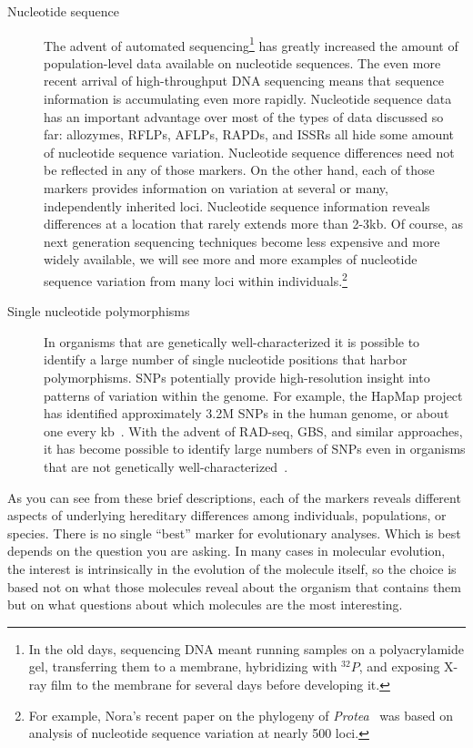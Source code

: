 \begin{description}
\item[Nucleotide sequence] The advent of automated
  sequencing\footnote{In the old days, sequencing DNA meant running
    samples on a polyacrylamide gel, transferring them to a membrane,
    hybridizing with $^{32}P$, and exposing X-ray film to the membrane
    for several days before developing it.} has greatly increased the
  amount of population-level data available on nucleotide
  sequences. The even more recent arrival of high-throughput DNA
  sequencing means that sequence information is accumulating even more
  rapidly. Nucleotide sequence data has an important advantage over
  most of the types of data discussed so far: allozymes, RFLPs, AFLPs,
  RAPDs, and ISSRs all hide some amount of nucleotide sequence
  variation. Nucleotide sequence differences need not be reflected in
  any of those markers. On the other hand, each of those markers
  provides information on variation at several or many, independently
  inherited loci. Nucleotide sequence information reveals differences
  at a location that rarely extends more than 2-3kb. Of course, as
  next generation sequencing techniques become less expensive and more
  widely available, we will see more and more examples of nucleotide
  sequence variation from many loci within individuals.\footnote{For
    example, Nora's recent paper on the phylogeny of {\it
      Protea\/}~\cite{Mitchell-etal-2017} was based on analysis of
    nucleotide sequence variation at nearly 500 loci.}

\item[Single nucleotide polymorphisms] In organisms that are
  genetically well-characterized it is possible to identify a large
  number of single nucleotide positions that harbor
  polymorphisms. SNPs potentially provide high-resolution insight into
  patterns of variation within the genome. For example, the HapMap
  project has identified approximately 3.2M SNPs in the human genome,
  or about one every kb~\cite{HapMap-2007}. With the advent of
  RAD-seq, GBS, and similar approaches, it has become possible to
  identify large numbers of SNPs even in organisms that are not
  genetically
  well-characterized~\cite{Elshire-etal-2011,McKinney-etal-2017}.

\end{description}

As you can see from these brief descriptions, each of the markers
reveals different aspects of underlying hereditary differences among
individuals, populations, or species. There is no single ``best''
marker for evolutionary analyses. Which is best depends on the
question you are asking. In many cases in molecular evolution, the
interest is intrinsically in the evolution of the molecule itself, so
the choice is based not on what those molecules reveal about the
organism that contains them but on what questions about which
molecules are the most interesting.

